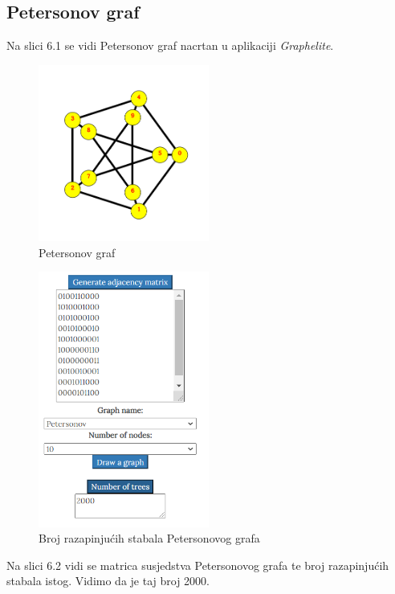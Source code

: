 \documentclass[times, utf8, zavrsni]{fer}
\begin{document}
\subsection{Petersonov graf}

Na slici 6.1 se vidi Petersonov graf nacrtan u aplikaciji \textit{Graphelite}.

\begin{figure}[htb]
	\centering
	\includegraphics[width=0.5\textwidth]{slike/petersonov.png}
	\caption{Petersonov graf}
	\label{fig:petersonov}
\end{figure}

\begin{figure}[htb]
	\centering
	\includegraphics[width=0.5\textwidth]{slike/petersonovbroj.png}
	\caption{Broj razapinjućih stabala Petersonovog grafa}
	\label{fig:petersonov-broj}
\end{figure}

Na slici 6.2 vidi se matrica susjedstva Petersonovog grafa te broj razapinjućih stabala istog. Vidimo da je taj broj 2000.
\end{document}
